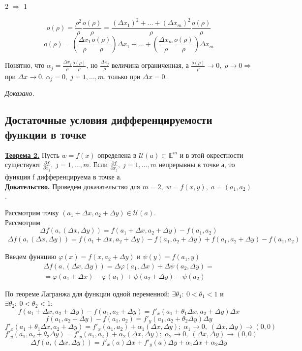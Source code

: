 \documentclass[a4paper,12pt]{article} %
\begin{document}
2 $\Rightarrow$ 1 

\[o(\rho) = \frac{\rho^2}{\rho} \frac{o(\rho)}{\rho} = \frac{(\Delta x_1)^2 + \ldots + (\Delta x_m)^2}{\rho} \frac{o(\rho)}{\rho}\]
\[o(\rho) = (\frac{\Delta x_1}{\rho}\frac{o(\rho)}{\rho})\Delta x_1 + \ldots + (\frac{\Delta x_m}{\rho}\frac{o(\rho)}{\rho})\Delta x_m \]

Понятно, что $\alpha_j = \frac{\Delta x_j}{\rho}\frac{o(\rho)}{\rho}$, но $\frac {\Delta x_j}{\rho}$ величина ограниченная, а $\frac {o(\rho)}{\rho} \to 0, \; \rho \to 0 \Rightarrow $ при $\Delta x \to \bar 0$.
$\alpha_j = 0, \; j = 1, \ldots, m$, только при $\Delta x = \bar0$.

\textit{Доказано.}
	
	
 \subsection{Достаточные условия дифференцируемости функции в точке}
 
 \underline{\textbf{Теорема 2.}} Пусть $w = f(x)$ определена в $\mathscr{U}(a) \subset \mathds{E}^m$
 и в этой окрестности существуют $\frac{\partial f}{\partial x_j}, \; j = 1, \ldots, m$. 
 Если  $\frac{\partial f}{\partial x_j}, \; j = 1, \ldots, m$ непрерывны в точке а, то функция f дифференцируема в точке а.\\
 
 \textbf{Докательство.} Проведем доказательство для $m = 2, \; w = f(x, y), \; a = (a_1, a_2)$.
 
 Рассмотрим точку $(a_1 + \Delta x, a_2 + \Delta y) \in \mathscr{U}(a)$.\\
 
 Рассмотрим 
 \[\Delta f(a, (\Delta x, \Delta y)) = f(a_1 + \Delta x, a_2 + \Delta y) - f(a_1, a_2)\]
 \begin{multline*}
 \Delta f(a, (\Delta x, \Delta y)) = f(a_1 + \Delta x, a_2 + \Delta y)
 - f(a_1, a_2 + \Delta y) + f(a_1, a_2 + \Delta y) - f(a_1, a_2)
 \end{multline*}
 
 Введем функцию $\varphi(x) = f(x, a_2 + \Delta y)$ и $\psi(y) = f(a_1, y)$
 \begin{multline*}
 \Delta f(a, (\Delta x, \Delta y)) = \Delta\varphi(a_1, \Delta x) + \Delta\psi(a_2, \Delta y) = \\
 = \varphi(a_1 + \Delta x) - \varphi(a_1) + \psi(a_2 + \Delta y) - \psi(a_2)
 \end{multline*}
 
 По теореме Лагранжа для функции одной переменной: $\exists \theta_1: ~0 < \theta_1 < 1$ и $\exists \theta_2: ~ 0 < \theta_2 < 1:$
 \[f(a_1 + \Delta x, a_2 + \Delta y) - f(a_1, a_2 + \Delta y) = f'_x(a_1 + \theta_1 \Delta x, a_2 + \Delta y)\Delta x\]
 \[f(a_1, a_2 + \Delta y) - f(a_1, a_2) = f'_y(a_1, a_2 + \theta_2 \Delta y)\Delta y\]
 \[f'_x(a_1 + \theta_1\Delta x, a_2 + \Delta y) = f'_x(a_1, a_2) + \alpha_1(\Delta x, \Delta y); \; \alpha_1 \to 0, \; (\Delta x, \Delta y) \to (0, 0)\]
  \[f'_y(a_1, a_2 + \theta_2 \Delta y) = f'_y(a_1, a_2) + \alpha_2(\Delta x, \Delta y); \; \alpha_2 \to 0, \; (\Delta x, \Delta y) \to (0, 0)\]
  \[\Delta f(a, (\Delta x, \Delta y)) = f'_x(a)\Delta x +f'_y(a)\Delta y + \alpha_1\Delta x + \alpha_2 \Delta y\]
  
\end{document}
